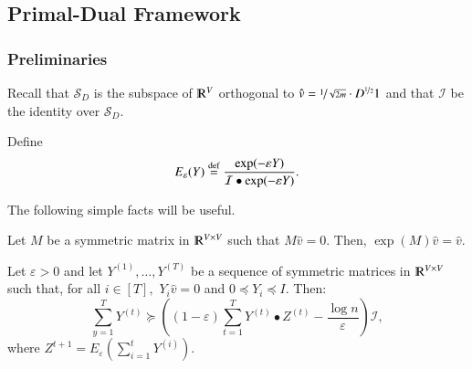 \documentclass[twoside,leqno,twocolumn]{article}
\newcommand{\nfrac}{\nicefrac}
\renewcommand{\mathbb}{\varmathbb}
\newcommand{\cI}{\mathcal I}
\newcommand{\cS}{\mathcal S}
\newcommand{\defeq}{\stackrel{\textup{def}}{=}}
\newcommand{\R}{\mathbb R}
\newcommand{\e}{\epsilon}
\let\e\varepsilon
\newcommand{\Deg}{D^{\nfrac{1}{2}}}
\numberwithin{equation}{section}
\begin{document}
\subsection{Primal-Dual Framework}\label{app:ak}

\subsubsection{Preliminaries}
Recall that $\cS_D$ is the subspace of $\R^V$ orthogonal to $\hat{v} = \nfrac{1}{\sqrt{2m}} \cdot \Deg 1$ and that $\cI$ be the identity over $\cS_D.$

Define 
$$
E_\e(Y) \defeq \frac{\exp(-\e Y)}{\cI \bullet \exp(-\e Y)}.
$$

The following simple facts will be useful.
\begin{fact}\label{fct:exp}
Let $M$ be a symmetric matrix in $\R^{V \times V}$ such that $M \hat{v} = 0.$ Then, $\exp(M) \hat{v} = \hat{v}.$
\end{fact}

\begin{theorem}\label{thm:expo}
Let $\e > 0$ and let $Y^{(1)}, \ldots, Y^{(T)}$ be a sequence of symmetric matrices in $\R^{V \times V}$ such that, for all $i \in [T],$ $ Y_i \hat{v} = 0$ and $0 \preceq Y_i \preceq I.$
Then:
$$
\sum_{y=1}^T Y^{(t)} \succeq \left((1-\e)\sum_{t=1}^T Y^{(t)} \bullet Z^{(t)} - \frac{\log n}{\e}\right) \cI,
$$
where $Z^{t+1} = E_\e(\sum_{i=1}^t Y^{(i)}).$
\end{theorem}
\end{document}
